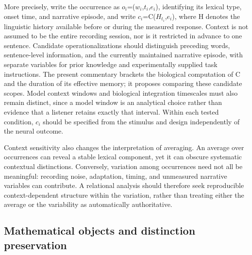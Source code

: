 \documentclass[11pt]{article}
\begin{document}
More precisely, write the occurrence as
\(o_i\)=(\(w_i\),\(t_i\),\(e_i\)), identifying its lexical type, onset
time, and narrative episode, and write \(c_i\)=C(\(H_{t_i}\),\(e_i\)),
where H denotes the linguistic history available before or during the
measured response. Context is not assumed to be the entire recording
session, nor is it restricted in advance to one sentence. Candidate
operationalizations should distinguish preceding words, sentence-level
information, and the currently maintained narrative episode, with
separate variables for prior knowledge and experimentally supplied task
instructions. The present commentary brackets the biological computation
of C and the duration of its effective memory; it proposes comparing
these candidate scopes. Model context windows and biological integration
timescales must also remain distinct, since a model window is an
analytical choice rather than evidence that a listener retains exactly
that interval. Within each tested condition, \(c_i\) should be specified
from the stimulus and design independently of the neural outcome.

Context sensitivity also changes the interpretation of averaging. An
average over occurrences can reveal a stable lexical component, yet it
can obscure systematic contextual distinctions. Conversely, variation
among occurrences need not all be meaningful: recording noise,
adaptation, timing, and unmeasured narrative variables can contribute. A
relational analysis should therefore seek reproducible context-dependent
structure within the variation, rather than treating either the average
or the variability as automatically authoritative.

\hypertarget{mathematical-objects-and-distinction-preservation}{%
\subsection{Mathematical objects and distinction
preservation}\label{mathematical-objects-and-distinction-preservation}}
\end{document}
